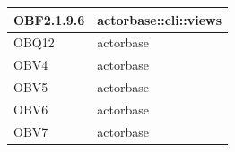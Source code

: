 \documentclass{scalatekids-article}
\begin{document}
\begin{longtable}[H]{|p{3.5cm}|p{7.5cm}|}
  \hline
  OBF2.1.9.6 & \multiLineCell[t]{actorbase::cli::views\\}\\
  \hline
  OBQ12 & \multiLineCell[t]{actorbase\\}\\
  \hline
  OBV4 & \multiLineCell[t]{actorbase\\}\\
  \hline
  OBV5 & \multiLineCell[t]{actorbase\\}\\
  \hline
  OBV6 & \multiLineCell[t]{actorbase\\}\\
  \hline
  OBV7 & \multiLineCell[t]{actorbase\\}\\
  \hline
\end{longtable}

\newpage
\appendix
\label{sec:appendice}

\newpage
\listoftables
\newpage
\listoffigures
\end{document}
